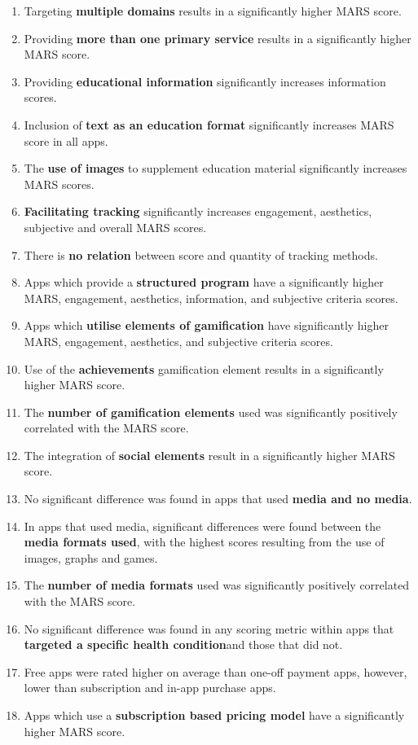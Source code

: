 \begin{enumerate}[noitemsep,topsep=0pt]
\item Targeting \textbf{multiple domains} results in a significantly higher MARS score.
\item Providing \textbf{more than one primary service} results in a significantly higher MARS score.
\item Providing \textbf{educational information} significantly increases information scores.
\item Inclusion of \textbf{text as an education format} significantly increases MARS score in all apps.
\item The \textbf{use of images} to supplement education material significantly increases MARS scores.
\item \textbf{Facilitating tracking} significantly increases engagement, aesthetics, subjective and overall MARS scores.
\item There is \textbf{no relation} between score and quantity of tracking methods.
\item Apps which provide a \textbf{structured program} have a significantly higher MARS, engagement, aesthetics, information, and subjective criteria scores.
\item Apps which \textbf{utilise elements of gamification} have significantly higher MARS, engagement, aesthetics, and subjective criteria scores.
\item Use of the \textbf{achievements} gamification element results in a significantly higher MARS score.
\item The \textbf{number of gamification elements} used was significantly positively correlated with the MARS score.
\item The integration of \textbf{social elements} result in a significantly higher MARS score.
\item No significant difference was found in apps that used \textbf{media and no media}.
\item In apps that used media, significant differences were found between the \textbf{media formats used}, with the highest scores resulting from the use of images, graphs and games.
\item The \textbf{number of media formats} used was significantly positively correlated with the MARS score.
\item No significant difference was found in any scoring metric within apps that \textbf{targeted a specific health condition}and those that did not.
\item Free apps were rated higher on average than one-off payment apps, however, lower than subscription and in-app purchase apps.
\item Apps which use a \textbf{subscription based pricing model} have a significantly higher MARS score.
\end{enumerate}

